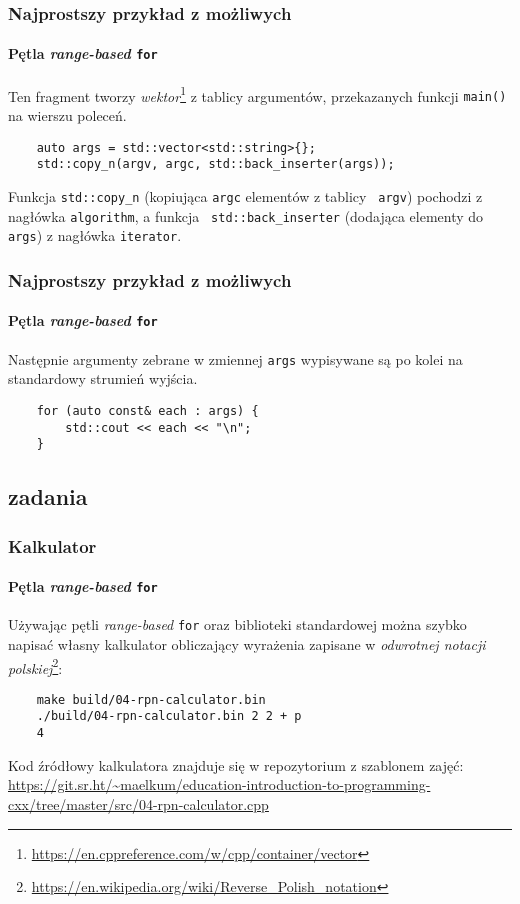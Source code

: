 \documentclass[aspectratio=169]{beamer}
\begin{document}
\begin{frame}[fragile]
    \frametitle{Najprostszy przykład z możliwych}
    \framesubtitle{Pętla \emph{range-based} {\tt for}}

    Ten fragment tworzy
    \emph{wektor}\footnote{\url{https://en.cppreference.com/w/cpp/container/vector}}
    z tablicy argumentów, przekazanych funkcji {\tt main()} na wierszu poleceń.

    {\footnotesize
    \begin{lstlisting}
    auto args = std::vector<std::string>{};
    std::copy_n(argv, argc, std::back_inserter(args));
    \end{lstlisting}}

    Funkcja {\tt std::copy\_n} (kopiująca {\tt argc} elementów z tablicy {\tt
    argv}) pochodzi z nagłówka {\tt algorithm}, a funkcja {\tt
    std::back\_inserter} (dodająca elementy do {\tt args}) z nagłówka
    {\tt iterator}.
\end{frame}

\begin{frame}[fragile]
    \frametitle{Najprostszy przykład z możliwych}
    \framesubtitle{Pętla \emph{range-based} {\tt for}}

    Następnie argumenty zebrane w zmiennej {\tt args} wypisywane są po kolei na
    standardowy strumień wyjścia.

    {\footnotesize
    \begin{lstlisting}
    for (auto const& each : args) {
        std::cout << each << "\n";
    }
    \end{lstlisting}}
\end{frame}

\subsection{zadania}

\begin{frame}[fragile]
    \frametitle{Kalkulator}
    \framesubtitle{Pętla \emph{range-based} {\tt for}}

    Używając pętli \emph{range-based} {\tt for} oraz biblioteki standardowej
    można szybko napisać własny kalkulator obliczający wyrażenia zapisane w
    \emph{odwrotnej notacji
    polskiej}\footnote{\url{https://en.wikipedia.org/wiki/Reverse_Polish_notation}}:

    \begin{lstlisting}
    make build/04-rpn-calculator.bin
    ./build/04-rpn-calculator.bin 2 2 + p
    4
    \end{lstlisting}

    {\tiny
    Kod źródłowy kalkulatora znajduje się w repozytorium z szablonem zajęć:
    \url{https://git.sr.ht/~maelkum/education-introduction-to-programming-cxx/tree/master/src/04-rpn-calculator.cpp}}
\end{frame}
\end{document}
